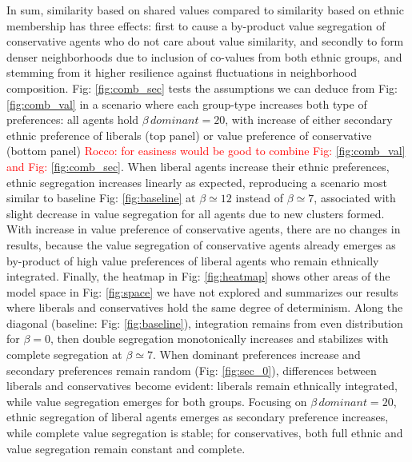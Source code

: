 \documentclass{article}
\newcommand{\rocco}[1]{{\textcolor{red}{Rocco: #1}}} %
\begin{document}
In sum, similarity based on shared values compared to similarity based on ethnic membership has three effects: first to cause a by-product value segregation of conservative agents who do not care about value similarity, and secondly to form denser neighborhoods due to inclusion of co-values from both ethnic groups, and stemming from it higher resilience against fluctuations in neighborhood composition. Fig: \ref{fig:comb_sec} tests the assumptions we can deduce from Fig: \ref{fig:comb_val} in a scenario where each group-type increases both type of preferences: all agents hold $\beta \, dominant = 20$, with increase of either secondary ethnic preference  of liberals (top panel) or value preference of conservative (bottom panel) \rocco{for easiness would be good to combine Fig: \ref{fig:comb_val} and Fig: \ref{fig:comb_sec}}. When liberal agents increase their ethnic preferences, ethnic segregation increases linearly as expected, reproducing a scenario most similar to baseline Fig: \ref{fig:baseline} at $\beta \simeq 12$ instead of $\beta \simeq 7$, associated with slight decrease in value segregation for all agents due to new clusters formed. With increase in value preference of conservative agents, there are no changes in results, because the value segregation of conservative agents already emerges as by-product of high value preferences of liberal agents who remain ethnically integrated. Finally, the heatmap in Fig: \ref{fig:heatmap} shows other areas of the model space in Fig: \ref{fig:space} we have not explored and summarizes our results where liberals and conservatives hold the same degree of determinism. Along the diagonal (baseline: Fig: \ref{fig:baseline}), integration remains from even distribution for $\beta = 0$, then double segregation monotonically increases and stabilizes with complete segregation at $\beta \simeq 7$. When dominant preferences increase and secondary preferences remain random (Fig: \ref{fig:sec_0}), differences between liberals and conservatives become evident: liberals remain ethnically integrated, while value segregation emerges for both groups. Focusing on $\beta \, dominant = 20$, ethnic segregation of liberal agents emerges as secondary preference increases, while complete value segregation is stable; for conservatives, both full ethnic and value segregation remain constant and complete.
\end{document}
